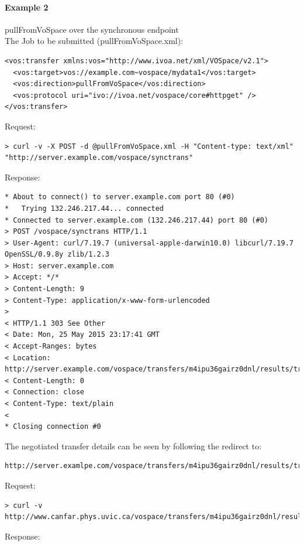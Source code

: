 \documentclass[11pt,a4paper]{ivoa}
\begin{document}
\paragraph{Example 2}
pullFromVoSpace over the synchronous endpoint
\\[5px]
\noindent
The Job to be submitted (pullFromVoSpace.xml):
\begin{lstlisting}
<vos:transfer xmlns:vos="http://www.ivoa.net/xml/VOSpace/v2.1">
  <vos:target>vos://example.com~vospace/mydata1</vos:target>
  <vos:direction>pullFromVoSpace</vos:direction>
  <vos:protocol uri="ivo://ivoa.net/vospace/core#httpget" />
</vos:transfer>
\end{lstlisting}
Request:
\begin{lstlisting}
> curl -v -X POST -d @pullFromVoSpace.xml -H "Content-type: text/xml" "http://server.example.com/vospace/synctrans"
\end{lstlisting}
Response:
\begin{lstlisting}
* About to connect() to server.example.com port 80 (#0)
*   Trying 132.246.217.44... connected
* Connected to server.example.com (132.246.217.44) port 80 (#0)
> POST /vospace/synctrans HTTP/1.1
> User-Agent: curl/7.19.7 (universal-apple-darwin10.0) libcurl/7.19.7 OpenSSL/0.9.8y zlib/1.2.3
> Host: server.example.com
> Accept: */*
> Content-Length: 9
> Content-Type: application/x-www-form-urlencoded
>
< HTTP/1.1 303 See Other
< Date: Mon, 25 May 2015 23:17:41 GMT
< Accept-Ranges: bytes
< Location: http://server.example.com/vospace/transfers/m4ipu36gairz0dnl/results/transferDetails
< Content-Length: 0
< Connection: close
< Content-Type: text/plain
<
* Closing connection #0
\end{lstlisting}
The negotiated transfer details can be seen by following the redirect to:
\begin{lstlisting}
http://server.examlpe.com/vospace/transfers/m4ipu36gairz0dnl/results/transferDetails
\end{lstlisting}
Request:
\begin{lstlisting}
> curl -v http://www.canfar.phys.uvic.ca/vospace/transfers/m4ipu36gairz0dnl/results/transferDetails
\end{lstlisting}
Response:
\end{document}
